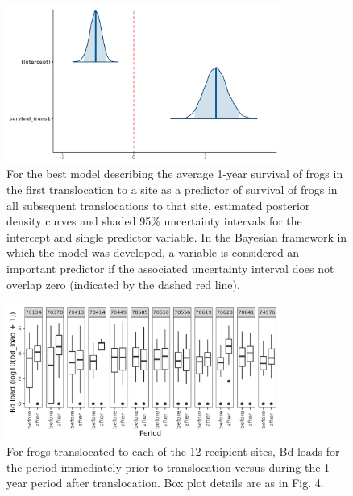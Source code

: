 \documentclass[9pt,twoside,lineno]{pnas-new}
\begin{document}
\begin{figure}

{\centering \includegraphics[width=0.8\textwidth]{figures/mcmc_areas_m2b.png}

}

\caption{\label{fig-transsurvival-postdens}For the best model describing
the average 1-year survival of frogs in the first translocation to a
site as a predictor of survival of frogs in all subsequent
translocations to that site, estimated posterior density curves and
shaded 95\% uncertainty intervals for the intercept and single predictor
variable. In the Bayesian framework in which the model was developed, a
variable is considered an important predictor if the associated
uncertainty interval does not overlap zero (indicated by the dashed red
line).}

\end{figure}\clearpage

\begin{figure}

{\centering \includegraphics[width=0.8\textwidth]{figures/bdload_beforeafter.png}

}

\caption{\label{fig-bdload-beforeafter}For frogs translocated to each of
the 12 recipient sites, Bd loads for the period immediately prior to
translocation versus during the 1-year period after translocation. Box
plot details are as in Fig. 4.}

\end{figure}\clearpage
\end{document}
